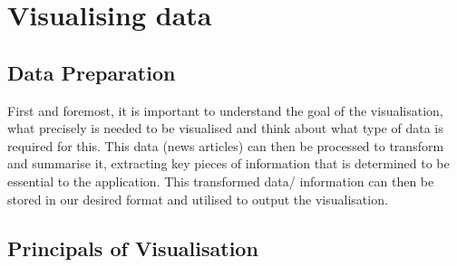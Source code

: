 \section{Visualising data}


\subsection{Data Preparation}
First and foremost, it is important to understand the goal of the visualisation, what precisely is needed to be visualised and think about what type of data is required for this. This data (news articles) can then be processed to transform and summarise it, extracting key pieces of information that is determined to be essential to the application. This transformed data/ information can then be stored in our desired format and utilised to output the visualisation. 

\subsection{Principals of Visualisation}

